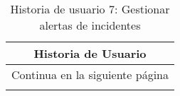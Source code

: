 \begin{longtable}{|p{6.7cm}|p{6.7cm}|}
    \caption{Historia de usuario 7: Gestionar alertas de incidentes} \label{tab:historia-7}
    \\
    \hline
    \multicolumn{2}{|c|}{\textbf{Historia de Usuario}}                                                                                                                                                           \\
    \hline

    \endfirsthead

    \hline
    \endhead

    \hline
    \multicolumn{2}{|c|}{{Continua en la siguiente página}}                                                                                                                                                      \\
    \hline
    \endfoot

    \hline
    \endlastfoot


\end{longtable}
